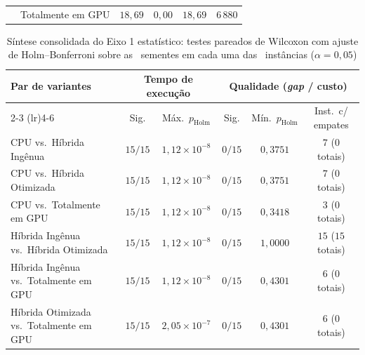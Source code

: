 \begin{tabeladensa}
\begin{longtable}[]{@{}llrrrr@{}}
                    & Totalmente em GPU & \(18{,}69\)     & \(0{,}00\)   & \(18{,}69\)     & \(6\,880\)      \\
\end{longtable}
\end{tabeladensa}

\begin{table}[htbp]
  \centering
  \caption{Síntese consolidada do Eixo 1 estatístico: testes pareados de Wilcoxon com ajuste de Holm--Bonferroni sobre as \totalrepeticoes\ sementes em cada uma das \totalinstancias\ instâncias (\(\alpha = 0{,}05\))}\label{tbl:axis1-wilcoxon}
  \begin{tabeladensa}
    \begin{tabular}{@{}lccccc@{}}
      \toprule
      Par de variantes & \multicolumn{2}{c}{Tempo de execução} & \multicolumn{3}{c}{Qualidade (\emph{gap} / custo)} \\
      \cmidrule(lr){2-3} \cmidrule(lr){4-6}
      & Sig. & Máx.\ \(p_{\text{Holm}}\) & Sig. & Mín.\ \(p_{\text{Holm}}\) & Inst.\ c/ empates \\
      \midrule
      CPU vs.\ Híbrida Ingênua               & \(15/15\) & \(1{,}12 \times 10^{-8}\) & \(0/15\) & \(0{,}3751\) & \(7\) (\(0\) totais)  \\
      CPU vs.\ Híbrida Otimizada             & \(15/15\) & \(1{,}12 \times 10^{-8}\) & \(0/15\) & \(0{,}3751\) & \(7\) (\(0\) totais)  \\
      CPU vs.\ Totalmente em GPU             & \(15/15\) & \(1{,}12 \times 10^{-8}\) & \(0/15\) & \(0{,}3418\) & \(3\) (\(0\) totais)  \\
      Híbrida Ingênua vs.\ Híbrida Otimizada & \(15/15\) & \(1{,}12 \times 10^{-8}\) & \(0/15\) & \(1{,}0000\) & \(15\) (\(15\) totais) \\
      Híbrida Ingênua vs.\ Totalmente em GPU & \(15/15\) & \(1{,}12 \times 10^{-8}\) & \(0/15\) & \(0{,}4301\) & \(6\) (\(0\) totais)  \\
      Híbrida Otimizada vs.\ Totalmente em GPU & \(15/15\) & \(2{,}05 \times 10^{-7}\) & \(0/15\) & \(0{,}4301\) & \(6\) (\(0\) totais)  \\

\end{tabular}
\end{tabeladensa}
\end{table}
